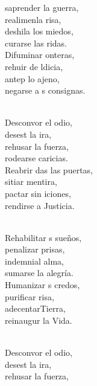 \documentclass[12pt]{article}
\begin{document}
\begin{multicols*}{2}
\begin{cancion}%
	saprender la guerra, \\
	realimenla risa, \\
	deshila los miedos, \\
	curarse las ridas. \\
	Difuminar onteras,\\
	rehuir de ldicia, \\
	antep lo ajeno,\\
	negarse a s consignas. \\\jump\\
	\begin{chorus}%
	Desconvor el odio,\\
	desest la ira, \\
	rehusar  la fuerza, \\
	rodearse  caricias. \\
	Reabrir das las puertas, \\
	sitiar  mentira, \\
	pactar sin iciones,\\
	rendirse a  Justicia.\\
	\end{chorus}%
	\jump\\
	Rehabilitar s sueños, \\
	penalizar prisas, \\
	indemnial alma, \\
	sumarse la alegría. \\
	Humanizar s credos, \\
	purificar risa, \\
	adecentarTierra,\\
	reinaugur la Vida. \\\jump\\
	\begin{chorus}%
	Desconvor el odio,\\
	desest la ira, \\
	rehusar  la fuerza, \\

\end{chorus}
\end{cancion}
\end{multicols*}
\end{document}
